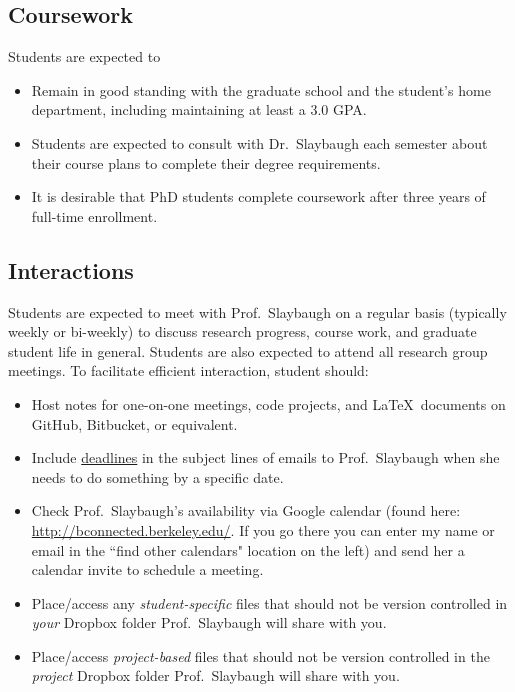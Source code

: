 \documentclass[12pt,twoside]{article}
\begin{document}
\subsection*{Coursework}

Students are expected to 
%
\begin{itemize}
\item Remain in good standing with the graduate school and the student's home department, including maintaining at least a 3.0 GPA.
\item Students are expected to consult with Dr.\ Slaybaugh each semester about their course plans to complete their degree requirements.
\item It is desirable that PhD students complete coursework after three years of full-time enrollment. 
\end{itemize}

\subsection*{Interactions}

Students are expected to meet with Prof.\ Slaybaugh on a regular basis (typically weekly or bi-weekly) to discuss research progress, course work, and graduate student life in general. Students are also expected to attend all research group meetings. To facilitate efficient interaction, student should: 
%
\begin{itemize}
\item Host notes for one-on-one meetings, code projects, and \LaTeX \ documents on GitHub, Bitbucket, or equivalent.
\item Include \underline{deadlines} in the subject lines of emails to Prof.\ Slaybaugh when she needs to do something by a specific date.
\item Check Prof.\ Slaybaugh's availability via Google calendar (found here:\\ \href{http://bconnected.berkeley.edu/}{http://bconnected.berkeley.edu/}. If you go there you can enter my name or email in the ``find other calendars" location on the left) and send her a calendar invite to schedule a meeting.
\item Place/access any \textit{student-specific} files that should not be version controlled in \textit{your} Dropbox folder Prof.\ Slaybaugh will share with you. 
\item Place/access \textit{project-based} files that should not be version controlled in the \textit{project} Dropbox folder Prof.\ Slaybaugh will share with you.
\end{itemize}
\end{document}
